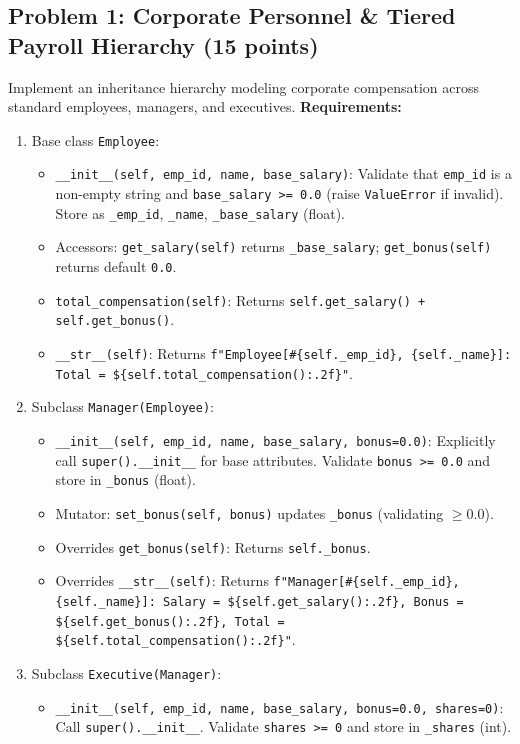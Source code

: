 \documentclass[11pt,a4paper]{article}
\begin{document}
\subsection*{Problem 1: Corporate Personnel \& Tiered Payroll Hierarchy (15 points)}
Implement an inheritance hierarchy modeling corporate compensation across standard employees, managers, and executives.
\textbf{Requirements:}
\begin{enumerate}[label=\arabic*.,leftmargin=2em,itemsep=1.2pt]
\item Base class \texttt{Employee}:
  \begin{itemize}
  \item \texttt{\_\_init\_\_(self, emp\_id, name, base\_salary)}: Validate that \texttt{emp\_id} is a non-empty string and \texttt{base\_salary >= 0.0} (raise \texttt{ValueError} if invalid). Store as \texttt{\_emp\_id}, \texttt{\_name}, \texttt{\_base\_salary} (float).
  \item Accessors: \texttt{get\_salary(self)} returns \texttt{\_base\_salary}; \texttt{get\_bonus(self)} returns default \texttt{0.0}.
  \item \texttt{total\_compensation(self)}: Returns \lstinline|self.get_salary() + self.get_bonus()|.
  \item \texttt{\_\_str\_\_(self)}: Returns \lstinline|f"Employee[#{self._emp_id}, {self._name}]: Total = ${self.total_compensation():.2f}"|.
  \end{itemize}
\item Subclass \texttt{Manager(Employee)}:
  \begin{itemize}
  \item \texttt{\_\_init\_\_(self, emp\_id, name, base\_salary, bonus=0.0)}: Explicitly call \texttt{super().\_\_init\_\_} for base attributes. Validate \texttt{bonus >= 0.0} and store in \texttt{\_bonus} (float).
  \item Mutator: \texttt{set\_bonus(self, bonus)} updates \texttt{\_bonus} (validating $\ge 0.0$).
  \item Overrides \texttt{get\_bonus(self)}: Returns \texttt{self.\_bonus}.
  \item Overrides \texttt{\_\_str\_\_(self)}: Returns \lstinline|f"Manager[#{self._emp_id}, {self._name}]: Salary = ${self.get_salary():.2f}, Bonus = ${self.get_bonus():.2f}, Total = ${self.total_compensation():.2f}"|.
  \end{itemize}
\item Subclass \texttt{Executive(Manager)}:
  \begin{itemize}
  \item \texttt{\_\_init\_\_(self, emp\_id, name, base\_salary, bonus=0.0, shares=0)}: Call \texttt{super().\_\_init\_\_}. Validate \texttt{shares >= 0} and store in \texttt{\_shares} (int).

\end{itemize}
\end{enumerate}
\end{document}
